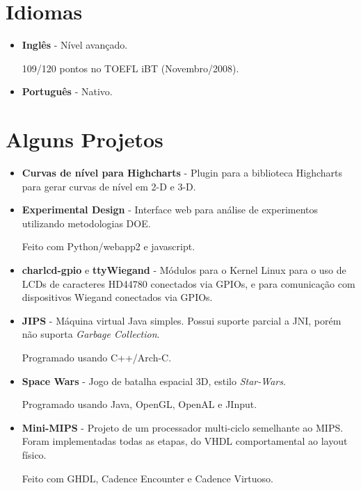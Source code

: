 \documentclass[a4paper,10pt]{article}
\begin{document}
  \section{Idiomas}
    \begin{itemize}
      \item  
        \textbf{Inglês} - Nível avançado.

        109/120 pontos no TOEFL iBT (Novembro/2008).

      \item  
        \textbf{Português} - Nativo.
    \end{itemize}


  \section{Alguns Projetos}
    \begin{itemize}
      \item 
        \textbf{Curvas de nível para Highcharts} - Plugin para a biblioteca Highcharts para gerar curvas de nível em 2-D e 3-D.
      
      \item 
        \textbf{Experimental Design} - Interface web para análise de experimentos utilizando metodologias DOE.

        Feito com Python/webapp2 e javascript.
        
      \item 
        \textbf{charlcd-gpio} e \textbf{ttyWiegand} - Módulos para o Kernel Linux para o uso de LCDs de caracteres HD44780 conectados via GPIOs, e para comunicação com dispositivos Wiegand conectados via GPIOs.

      \item 
        \textbf{JIPS} - Máquina virtual Java simples. Possui suporte parcial a JNI, porém não suporta \emph{Garbage Collection}.

        Programado usando C++/Arch-C.

      \item 
        \textbf{Space Wars} - Jogo de batalha espacial 3D, estilo \emph{Star-Wars}.

        Programado usando Java, OpenGL, OpenAL e JInput.

      \item 
        \textbf{Mini-MIPS} - Projeto de um processador multi-ciclo semelhante ao MIPS. Foram implementadas todas as etapas, do VHDL comportamental ao layout físico.

        Feito com GHDL, Cadence Encounter e Cadence Virtuoso.


\end{itemize}
\end{document}

